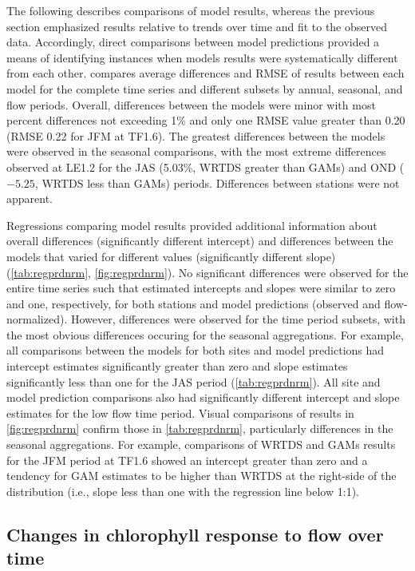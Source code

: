 \documentclass[letterpaper,12pt,oneside]{article}\usepackage[]{graphicx}\usepackage[]{color}
\begin{document}
The following describes comparisons of model results, whereas the previous section emphasized results relative to trends over time and fit to the observed data.  Accordingly, direct comparisons between model predictions provided a means of identifying instances when models results were systematically different from each other.   compares average differences and \ac{RMSE} of results between each model for the complete time series and different subsets by annual, seasonal, and flow periods.  Overall, differences between the models were minor with most percent differences not exceeding 1\% and only one \ac{RMSE} value greater than 0.20 (\ac{RMSE} 0.22 for \ac{JFM} at TF1.6).  The greatest differences between the models were observed in the seasonal comparisons, with the most extreme differences observed at LE1.2 for the \ac{JAS} (5.03\%, \ac{WRTDS} greater than \acp{GAM}) and \ac{OND} (\ensuremath{-5.25}, \ac{WRTDS} less than \acp{GAM}) periods.  Differences between stations were not apparent.  

Regressions comparing model results provided additional information about overall differences (significantly different intercept) and differences between the models that varied for different values (significantly different slope) (\cref{tab:regprdnrm}, \cref{fig:regprdnrm}).  No significant differences were observed for the entire time series such that estimated intercepts and slopes were similar to zero and one, respectively, for both stations and model predictions (observed and flow-normalized).  However, differences were observed for the time period subsets, with the most obvious differences occuring for the seasonal aggregations.  For example, all comparisons between the models for both sites and model predictions had intercept estimates significantly greater than zero and slope estimates significantly less than one for the \ac{JAS} period (\cref{tab:regprdnrm}).  All site and model prediction comparisons also had significantly different intercept and slope estimates for the low flow time period.  Visual comparisons of results in \cref{fig:regprdnrm} confirm those in \cref{tab:regprdnrm}, particularly differences in the seasonal aggregations.  For example, comparisons of \ac{WRTDS} and \acp{GAM} results for the \ac{JFM} period at TF1.6 showed an intercept greater than zero and a tendency for \ac{GAM} estimates to be higher than \ac{WRTDS} at the right-side of the distribution (i.e., slope less than one with the regression line below 1:1).

\subsection{Changes in chlorophyll response to flow over time}
\end{document}
